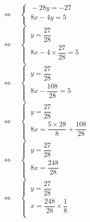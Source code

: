\documentclass[a4paper,11pt,exos]{nsi} %
\begin{document}
\begin{enumerate}
\begin{tabbing}
                \>  $\iff\quad \left\{
                    \begin{array}{l}
                    \ -28y=-27 \\
                    \ 8x-4y=5\\
                \end{array} \right.$\\[.5em]

                \>  $\iff\quad \left\{
                    \begin{array}{l}
                    \ y=\dfrac{27}{28} \\[.5em]
                    \ 8x-4\times \dfrac{27}{28}=5\\
                \end{array} \right.$\\[.5em]

                \>  $\iff\quad \left\{
                    \begin{array}{l}
                    \ y=\dfrac{27}{28} \\[.5em]
                    \ 8x-\dfrac{108}{28}=5\\
                \end{array} \right.$\\[.5em]

                \>  $\iff\quad \left\{
                    \begin{array}{l}
                    \ y=\dfrac{27}{28} \\[.5em]
                    \ 8x=\dfrac{5\times 28}{8}+\dfrac{108}{28}\\
                \end{array} \right.$\\[.5em]

                \>  $\iff\quad \left\{
                    \begin{array}{l}
                    \ y=\dfrac{27}{28} \\[.5em]
                    \ 8x=\dfrac{248}{28}\\
                \end{array} \right.$\\[.5em]

                \>  $\iff\quad \left\{
                    \begin{array}{l}
                    \ y=\dfrac{27}{28} \\[.5em]
                    \ x=\dfrac{248}{28}\times \dfrac{1}{8}\\
                \end{array} \right.$\\[.5em]


\end{tabbing}
\end{enumerate}
\end{document}
